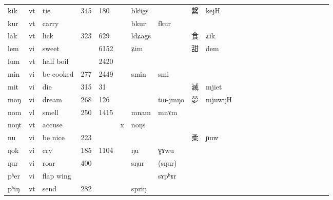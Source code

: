 \documentclass[oldfontcommands,oneside,a4paper,11pt]{article}
\newcommand{\ipa}[1]{{\phon #1}} %
\newcommand{\zh}[1]{{\cn #1}}
\begin{document}
\begin{table}[h]
{\begin{tabular}{lllllllllllllllllllllll}
\ipa{kik}   &  	vt   &  	tie   &  	\tiny 345   &  	\tiny 180   &  	   &  	\ipa{bkʲigs}   &  	\ipa{}   &  	\zh{繫}   &  	\ipa{kejH}   \\  		
\ipa{kur}   &  	vt   &  	carry   &  	\tiny    &  	\tiny    &  	   &  	\ipa{bkur}   &  	\ipa{fkur}   &  	\zh{}   &  	\ipa{}   \\  		
\ipa{lak}   &  	vt   &  	lick   &  	\tiny 323   &  	\tiny 629   &  	   &  	\ipa{ldʑags}   &  	\ipa{}   &  	\zh{食}   &  	\ipa{ʑik}   \\  	
\ipa{lem}   &  	vi   &  	sweet   &  	\tiny    &  	\tiny   6152	   &    &  	\ipa{ʑim}   &  	\ipa{}   &  	\zh{甜}   &  	\ipa{dem}   \\  			
\ipa{lum}   &  	vt   &  	half boil   &  	\tiny    &  	\tiny 2420   &  	   &  	\ipa{}   &  	\ipa{}   &  	\zh{}   &  	\ipa{}   \\  		
\ipa{min}   &  	vi   &  	be cooked   &  	\tiny 277   &  	\tiny 2449   &  	   &  	\ipa{smin}   &  	\ipa{smi}   &  	\zh{}   &  	\ipa{}   \\  		
\ipa{mit}   &  	vi   &  	die   &  	\tiny 315   &  	\tiny 31   &  	   &  	\ipa{}   &  	\ipa{}   &  	\zh{滅}   &  	\ipa{mjiet}   \\  		
\ipa{moŋ}   &  	vi   &  	dream   &  	\tiny 268   &  	\tiny 126   &  	   &  	\ipa{}   &  	\ipa{tɯ-jmŋo}   &  	\zh{夢}   &  	\ipa{mjuwŋH}   \\  		
\ipa{nom}   &  	vl   &  	smell   &  	\tiny 250   &  	\tiny 1415   &  	   &  	\ipa{mnam}   &  	\ipa{mnɤm}   &  	\zh{}   &  	\ipa{}   \\  		
\ipa{noŋt}   &  	vt   &  	accuse   &  	\tiny    &  	\tiny    &  	x   &  	\ipa{noŋs }   &  	\ipa{}   &  	\zh{}   &  	\ipa{}   \\  		
\ipa{nu}   &  	vi   &  	be nice   &  	\tiny 223   &  	\tiny    &  	   &  	\ipa{}   &  	\ipa{}   &  	\zh{柔}   &  	\ipa{ɲuw}   \\  		
\ipa{ŋok}   &  	vi   &  	cry   &  	\tiny 185   &  	\tiny 1104   &  	   &  	\ipa{ŋu}   &  	\ipa{ɣɤwu}   &  	\zh{}   &  	\ipa{}   \\  		
\ipa{ŋur}   &  	vi   &  	roar   &  	\tiny 400   &  	\tiny    &  	   &  	\ipa{sŋur}   &  	\ipa{(sŋur)}   &  	\zh{}   &  	\ipa{}   \\  		
\ipa{pʰer}   &  	vi   &  	flap wing   &  	\tiny    &  	\tiny    &  	   &  	\ipa{}   &  	\ipa{sɤpʰɤr}   &  	\zh{}   &  	\ipa{}   \\  		
\ipa{pʰiŋ}   &  	vt   &  	send   &  	\tiny 282   &  	\tiny    &  	   &  	\ipa{spriŋ}   &  	\ipa{}   &  	\zh{}   &  	\ipa{}   \\  		

\end{tabular}}
\end{table}
\end{document}
